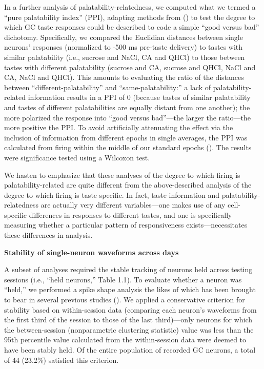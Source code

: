 \begin{refsection}
In a further analysis of palatability-relatedness, we computed what we termed a “pure palatability index” (PPI), adapting methods from (\cite{fontanini2009a}) to test the degree to which GC taste responses could be described to code a simple “good versus bad” dichotomy. Specifically, we compared the Euclidian distances between single neurons’ responses (normalized to -500 ms pre-taste delivery) to tastes with similar palatability (i.e., sucrose and NaCl, CA and QHCl) to those between tastes with different palatability (sucrose and CA, sucrose and QHCl, NaCl and CA, NaCl and QHCl). This amounts to evaluating the ratio of the distances between “different-palatability” and “same-palatability:” a lack of palatability-related information results in a PPI of 0 (because tastes of similar palatability and tastes of different palatabilities are equally distant from one another); the more polarized the response into “good versus bad”—the larger the ratio—the more positive the PPI. To avoid artificially attenuating the effect via the inclusion of information from different epochs in single averages, the PPI was calculated from firing within the middle of our standard epochs (\cite{katz-a,katz2001a}). The results were significance tested using a Wilcoxon test.

We hasten to emphasize that these analyses of the degree to which firing is palatability-related are quite different from the above-described analysis of the degree to which firing is taste specific. In fact, taste information and palatability-relatedness are actually very different variables—one makes use of any cell-specific differences in responses to different tastes, and one is specifically measuring whether a particular pattern of responsiveness exists—necessitates these differences in analysis.

\smallskip
\noindent\textbf{Stability of single-neuron waveforms across days}\par
\noindent 
A subset of analyses required the stable tracking of neurons held across testing sessions (i.e., “held neurons,” Table 1.1). To evaluate whether a neuron was “held,” we performed a spike shape analysis the likes of which has been brought to bear in several previous studies (\cite{grossman2008a,moran2014a,nicolelis2003a,herry2008a}). We applied a conservative criterion for stability based on within-session data (comparing each neuron’s waveforms from the first third of the session to those of the last third)—only neurons for which the between-session (nonparametric clustering statistic) value was less than the 95th percentile value calculated from the within-session data were deemed to have been stably held. Of the entire population of recorded GC neurons, a total of 44 (23.2\%) satisfied this criterion.


\end{refsection}
